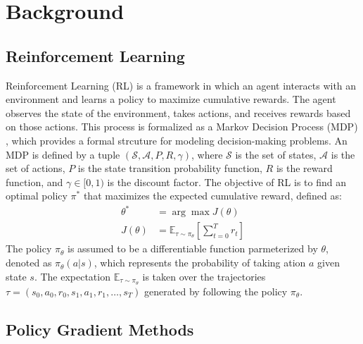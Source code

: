 
\chapter{Background}\label{chapter2}

\section{Reinforcement Learning} \label{chap2:sec1}

Reinforcement Learning (RL) is a framework in which an agent interacts with an environment and learns a policy to maximize cumulative rewards.
The agent observes the state of the environment, takes actions, and receives rewards based on those actions.
This process is formalized as a Markov Decision Process (MDP) \cite{MDP}, which provides a formal strcuture for modeling decision-making problems.
An MDP is defined by a tuple \((\mathcal{S}, \mathcal{A}, P, R, \gamma)\), where $\mathcal{S}$ is the set of states, $\mathcal{A}$ is the set of actions, $P$ is the state transition probability function, $R$ is the reward function, and $\gamma \in [0, 1)$ is the discount factor.
The objective of RL is to find an optimal policy $\pi^*$ that maximizes the expected cumulative reward, defined as:
\begin{equation}
  \begin{aligned}
    \theta^* &= \arg\max J(\theta) \\
    J(\theta) &= \mathbb{E}_{\tau \sim \pi_\theta} \left[\sum^T_{t = 0} r_t \right]
  \end{aligned}
\end{equation}
The policy $\pi_\theta$ is assumed to be a differentiable function parmeterized by $\theta$, denoted as $\pi_\theta(a|s)$, which represents the probability of taking ation $a$ given state $s$.
The expectation $\mathbb{E}_{\tau \sim \pi_\theta}$ is taken over the trajectories $\tau = (s_0, a_0, r_0, s_1, a_1, r_1, \ldots, s_T)$ generated by following the policy $\pi_\theta$.

\section{Policy Gradient Methods} \label{chap2:sec2}

